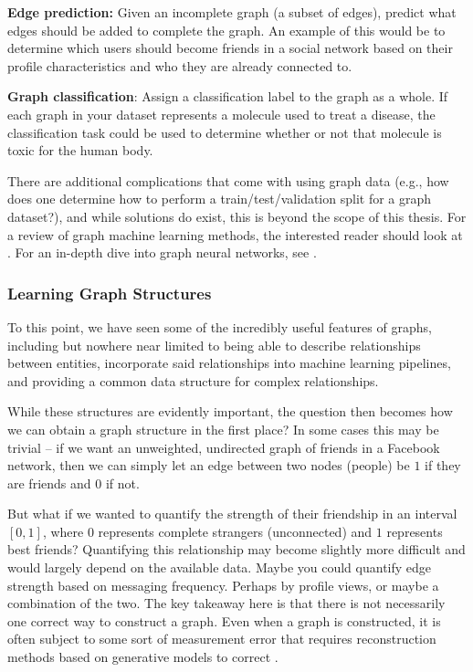 \documentclass{article}
\theoremstyle{definition}
\begin{document}
\textbf{Edge prediction:} Given an incomplete graph (a subset of edges), predict what edges should be added to complete the graph. An example of this would be to determine which users should become friends in a social network based on their profile characteristics and who they are already connected to.

\textbf{Graph classification}: Assign a classification label to the graph as a whole. If each graph in your dataset represents a molecule used to treat a disease, the classification task could be used to determine whether or not that molecule is toxic for the human body.

There are additional complications that come with using graph data (e.g., how does one determine how to perform a train/test/validation split for a graph dataset?), and while solutions do exist, this is beyond the scope of this thesis. For a review of graph machine learning methods, the interested reader should look at \cite{graphMLSurvey}. For an in-depth dive into graph neural networks, see \cite{GNNsurvey}.

\subsubsection{Learning Graph Structures}

To this point, we have seen some of the incredibly useful features of graphs, including but nowhere near limited to being able to describe relationships between entities, incorporate said relationships into machine learning pipelines, and providing a common data structure for complex relationships.

While these structures are evidently important, the question then becomes how we can obtain a graph structure in the first place? In some cases this may be trivial -- if we want an unweighted, undirected graph of friends in a Facebook network, then we can simply let an edge between two nodes (people) be $1$ if they are friends and $0$ if not.

But what if we wanted to quantify the strength of their friendship in an interval $[0,1]$, where $0$ represents complete strangers (unconnected) and $1$ represents best friends? Quantifying this relationship may become slightly more difficult and would largely depend on the available data. Maybe you could quantify edge strength based on messaging frequency. Perhaps by profile views, or maybe a combination of the two. The key takeaway here is that there is not necessarily one correct way to construct a graph. Even when a graph is constructed, it is often subject to some sort of measurement error that requires reconstruction methods based on generative models to correct \cite{PhysRevReconstructingNetworksErrors}.
\end{document}
